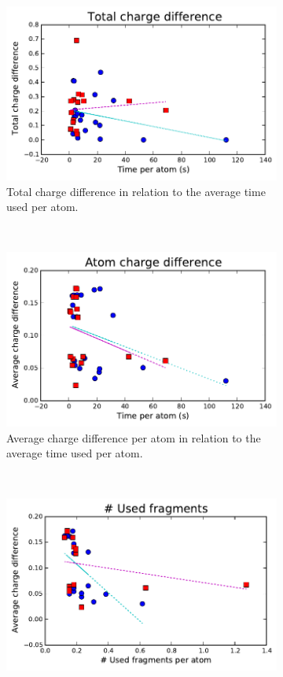 \begin{figure}[h!]
\centering
\begin{subfigure}[t]{0.48\textwidth}
\centering
\includegraphics[width=\textwidth]{img/graphs/3a_01.pdf}
\caption{Total charge difference in relation to the average time used per atom.}
\end{subfigure}%
~
\begin{subfigure}[t]{0.48\textwidth}
\centering
\includegraphics[width=\textwidth]{img/graphs/3a_00.pdf}
\caption{Average charge difference per atom in relation to the average time used per atom.}
\end{subfigure}%
\\[1em]
\begin{subfigure}[t]{0.48\textwidth}
\centering
\includegraphics[width=\textwidth]{img/graphs/3a_02.pdf}

\end{subfigure}
\end{figure}
